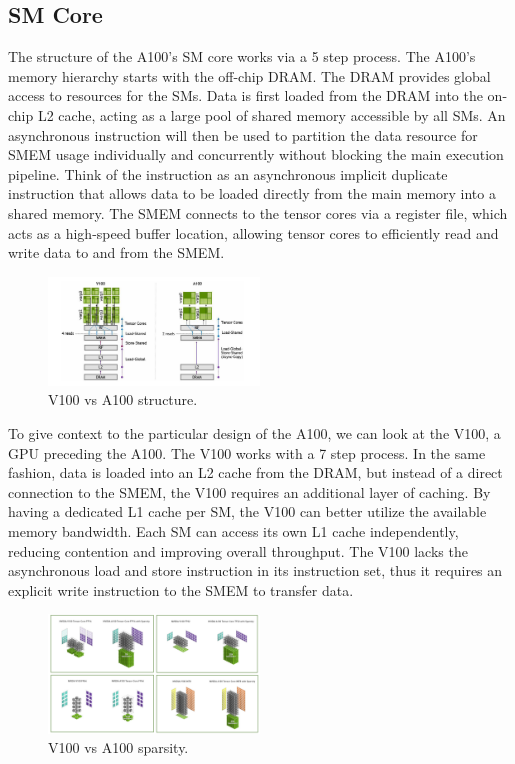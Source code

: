\documentclass[conference]{IEEEtran}
\begin{document}
    \subsection{SM Core}
    The structure of the A100's SM core works via a 5 step process.
    The A100's memory hierarchy starts with the off-chip DRAM\@.
    The DRAM provides global access to resources for the SMs.
    Data is first loaded from the DRAM into the on-chip L2 cache, acting as a large pool of shared memory accessible by all SMs.
    An asynchronous instruction will then be used to partition the data resource for SMEM usage individually and concurrently without blocking the main execution pipeline.
    Think of the instruction as an asynchronous implicit duplicate instruction that allows data to be loaded directly from the main memory into a shared memory.
    The SMEM connects to the tensor cores via a register file, which acts as a high-speed buffer location, allowing tensor cores to efficiently read and write data to and from the SMEM\@.

    \begin{figure}[htbp!]
        \centerline{\includegraphics[width=0.5\textwidth]{images/gpu_structure}}
        \caption{V100 vs A100 structure.}
        \label{fig}
    \end{figure}

    To give context to the particular design of the A100, we can look at the V100, a GPU preceding the A100.
    The V100 works with a 7 step process.
    In the same fashion, data is loaded into an L2 cache from the DRAM, but instead of a direct connection to the SMEM, the V100 requires an additional layer of caching.
    By having a dedicated L1 cache per SM, the V100 can better utilize the available memory bandwidth.
    Each SM can access its own L1 cache independently, reducing contention and improving overall throughput.
    The V100 lacks the asynchronous load and store instruction in its instruction set, thus it requires an explicit write instruction to the SMEM to transfer data.

    \begin{figure}[htbp!]
        \centerline{\includegraphics[width=0.5\textwidth]{images/gpu_sparsity}}
        \caption{V100 vs A100 sparsity.}
        \label{fig}
    \end{figure}
\end{document}
